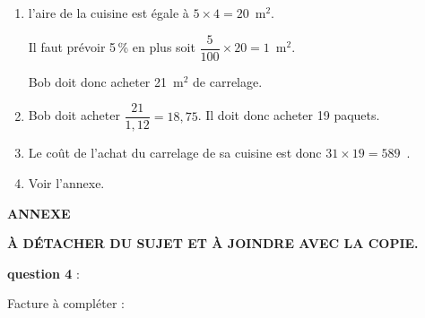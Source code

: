 
\medskip

%
%

\begin{enumerate}
\item %
l'aire de la cuisine est égale à $5 \times 4 = 20$~m$^2$.

Il faut prévoir 5\,\% en plus soit $\dfrac{5}{100}\times 20 = 1$~m$^2$.

Bob doit donc acheter 21~m$^2$ de carrelage.
\item %
Bob doit acheter $\dfrac{21}{1,12} = 18,75$. Il doit donc acheter 19 paquets.

\item %
Le coût de l'achat du carrelage de sa cuisine est donc $31 \times 19 = 589$~\EUR.
\item  %

Voir l'annexe.
\end{enumerate}
\bigskip

\begin{center}
\textbf{ANNEXE }

\textbf{À DÉTACHER DU SUJET ET À JOINDRE AVEC LA COPIE. }
\end{center}

 \textbf{question 4 }: 

 Facture à compléter : \\
\bigskip

